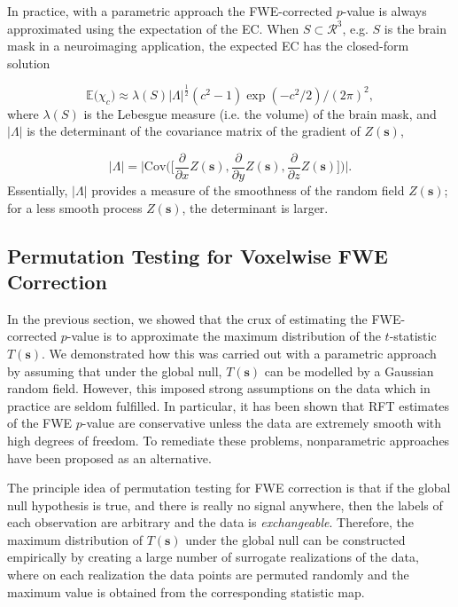 In practice, with a parametric approach the FWE-corrected $p$-value is always approximated using the expectation of the EC. When $S \subset \mathcal{R}^{3}$,  e.g. $S$ is the brain mask in a neuroimaging application, the expected EC has the closed-form solution 

\begin{equation}
\label{eq:EC_closed_form_approx}
\mathbb{E}\Big(\chi_{c} \Big) \approx \lambda(S)|\Lambda|^{\frac{1}{2}}(c^{2} - 1)\exp{(- c^{2}/2)}/(2\pi)^{2},
\end{equation}
where $\lambda(S)$ is the Lebesgue measure (i.e. the volume) of the brain mask, and $|\Lambda|$ is the determinant of the covariance matrix of the gradient of $Z(\bm{s})$,

\begin{equation}
\label{Lamda_determinant}
|\Lambda| = \Bigg|\mathrm{Cov}\bigg(\bigg[\frac{\partial}{\partial x}Z(\bm{s}), \frac{\partial}{\partial y}Z(\bm{s}), \frac{\partial}{\partial z}Z(\bm{s})\bigg]\bigg)\Bigg|.
\end{equation}
Essentially, $|\Lambda|$ provides a measure of the smoothness of the random field $Z(\bm{s})$; for a less smooth process $Z(\bm{s})$, the determinant is  larger. 


\subsection{Permutation Testing for Voxelwise FWE Correction}

In the previous section, we showed that the crux of estimating the FWE-corrected $p$-value is to approximate the maximum distribution of the $t$-statistic $T(\bm{s})$. We demonstrated how this was carried out with a parametric approach by assuming that under the global null, $T(\bm{s})$ can be modelled by a Gaussian random field. However, this imposed strong assumptions on the data which in practice are seldom fulfilled. In particular, it has been shown that RFT estimates of the FWE $p$-value are conservative unless the data are extremely smooth with high degrees of freedom. To remediate these problems, nonparametric approaches have been proposed as an alternative.

The principle idea of permutation testing for FWE correction is that if the global null hypothesis is true, and there is really no signal anywhere, then the labels of each observation are arbitrary and the data is \textit{exchangeable}. Therefore, the maximum distribution of $T(\bm{s})$ under the global null can be constructed empirically by creating a large number of surrogate realizations of the data, where on each realization the data points are permuted randomly and the maximum value is obtained from the corresponding statistic map. 

